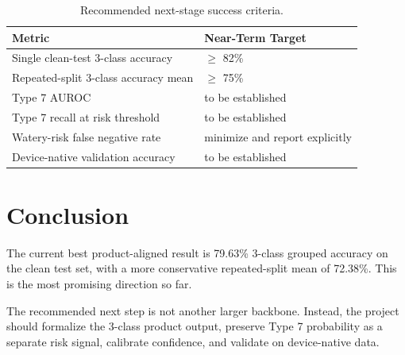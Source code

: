 \documentclass[11pt]{article}
\begin{document}
\begin{table}[h]
\centering
\begin{tabular}{ll}
\toprule
Metric & Near-Term Target \\
\midrule
Single clean-test 3-class accuracy & $\geq$ 82\% \\
Repeated-split 3-class accuracy mean & $\geq$ 75\% \\
Type 7 AUROC & to be established \\
Type 7 recall at risk threshold & to be established \\
Watery-risk false negative rate & minimize and report explicitly \\
Device-native validation accuracy & to be established \\
\bottomrule
\end{tabular}
\caption{Recommended next-stage success criteria.}
\end{table}

\section{Conclusion}

The current best product-aligned result is 79.63\% 3-class grouped accuracy on the clean test set, with a more conservative repeated-split mean of 72.38\%. This is the most promising direction so far.

The recommended next step is not another larger backbone. Instead, the project should formalize the 3-class product output, preserve Type 7 probability as a separate risk signal, calibrate confidence, and validate on device-native data.
\end{document}
